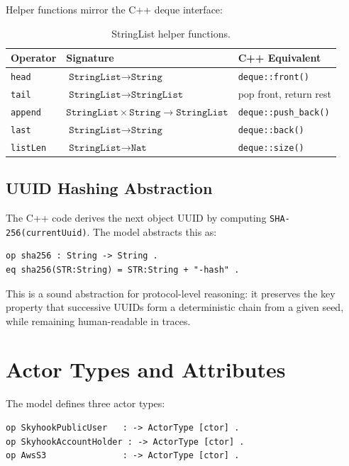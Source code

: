 \documentclass[11pt]{article}
\begin{document}
Helper functions mirror the C++ deque interface:

\begin{table}[H]
\centering
\begin{tabular}{@{}llp{7cm}@{}}
\toprule
\textbf{Operator} & \textbf{Signature} & \textbf{C++ Equivalent} \\
\midrule
\texttt{head}    & $\texttt{StringList} \to \texttt{String}$      & \texttt{deque::front()} \\
\texttt{tail}    & $\texttt{StringList} \to \texttt{StringList}$   & pop front, return rest \\
\texttt{append}  & $\texttt{StringList} \times \texttt{String} \to \texttt{StringList}$ & \texttt{deque::push\_back()} \\
\texttt{last}    & $\texttt{StringList} \to \texttt{String}$       & \texttt{deque::back()} \\
\texttt{listLen} & $\texttt{StringList} \to \texttt{Nat}$          & \texttt{deque::size()} \\
\bottomrule
\end{tabular}
\caption{StringList helper functions.}
\end{table}

\subsection{UUID Hashing Abstraction}

The C++ code derives the next object UUID by computing
\texttt{SHA-256(currentUuid)}.  The model abstracts this as:

\begin{lstlisting}[caption={sha256 abstraction}]
op sha256 : String -> String .
eq sha256(STR:String) = STR:String + "-hash" .
\end{lstlisting}

This is a sound abstraction for protocol-level reasoning: it preserves
the key property that successive UUIDs form a deterministic chain from
a given seed, while remaining human-readable in traces.

\section{Actor Types and Attributes}\label{sec:actors}

The model defines three actor types:

\begin{lstlisting}[caption={Actor type constructors}]
op SkyhookPublicUser   : -> ActorType [ctor] .
op SkyhookAccountHolder : -> ActorType [ctor] .
op AwsS3               : -> ActorType [ctor] .
\end{lstlisting}
\end{document}

